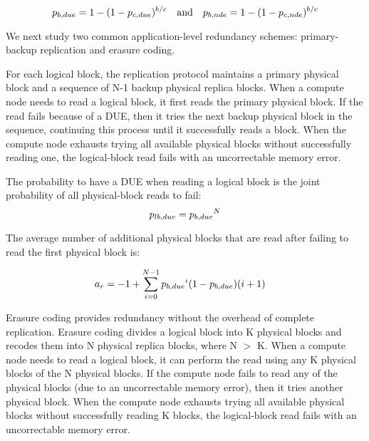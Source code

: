 \vspace{-0.2cm}
\begin{equation*}
{p_{b,due}}= 1 - (1-{p_{c,due}})^{b/c} \quad \mathrm{and} \quad {p_{b,nde}}= 1 - (1-{p_{c,nde}})^{b/c}
\end{equation*}

%
We next study two common application-level redundancy schemes: primary-backup replication and erasure coding.

For each logical block, the replication protocol maintains a primary physical block and a sequence of N-1 backup physical replica blocks.
When a compute node needs to read a logical block, it first reads the primary physical block. If the read fails because of a DUE, then it tries the next backup physical block in the sequence, continuing this process until it successfully reads a block. 
When the compute node exhausts trying all available physical blocks without successfully reading one, the logical-block read fails with an uncorrectable memory error.

The probability to have a DUE when reading a logical block is the joint probability of all physical-block reads to fail:
\[
{p_{lb,due}} = {p_{b,due}}^{N}
\]


The average number of additional physical blocks that are read after failing to read the first physical block is:

\[
\begin{split}
a_r&= -1 + \sum_{i=0}^{N-1} {p_{b,due}}^i(1-{p_{b,due}})(i+1)
\end{split}
\]


Erasure coding provides redundancy without the overhead of complete replication.
Erasure coding divides a logical block into K physical blocks and recodes them into N physical replica blocks, where N $>$ K.
When a compute node needs to read a logical block, it can perform the read using any K physical blocks of the N physical blocks. If the compute node fails to read any of the physical blocks (due to an uncorrectable memory error), then it tries another physical block. 
When the compute node exhausts trying all available physical blocks without successfully reading K blocks, the logical-block read fails with an uncorrectable memory error.

